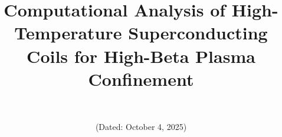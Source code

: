 \documentclass[10pt,twocolumn]{article}
\begin{document}
\title{Computational Analysis of High-Temperature Superconducting Coils for High-Beta Plasma Confinement}

\renewcommand{\thefootnote}{\fnsymbol{footnote}}
\author{\authorname\footnotemark\\\textit{\authoraffiliation}}
\date{(Dated: October 4, 2025)}

\makeatletter
\renewcommand\@makefntext[1]{%
	\noindent\@makefnmark\ \ignorespaces#1%
}
\renewcommand{\footnoterule}{\vspace{1ex}\noindent\hrule width \columnwidth\vspace{1ex}}
\makeatother

\maketitle
\renewcommand{\thefootnote}{\arabic{footnote}}
\sloppy
\end{document}
